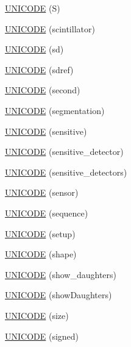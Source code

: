 \begin{DoxyCompactItemize}
\item 
\hyperlink{namespace_d_d4hep_1_1_x_m_l_af94f56ce81ab972984228369edb75959}{U\+N\+I\+C\+O\+DE} (S)
\item 
\hyperlink{namespace_d_d4hep_1_1_x_m_l_a5f445b0b81e3d1c46398930e978810a9}{U\+N\+I\+C\+O\+DE} (scintillator)
\item 
\hyperlink{namespace_d_d4hep_1_1_x_m_l_a4dbc6a36c60f2b43aad7b1f06167d0d8}{U\+N\+I\+C\+O\+DE} (sd)
\item 
\hyperlink{namespace_d_d4hep_1_1_x_m_l_a3366ec5d00717a755b13913dd6ba9092}{U\+N\+I\+C\+O\+DE} (sdref)
\item 
\hyperlink{namespace_d_d4hep_1_1_x_m_l_a3093c361a4ebe4730215c79afec7b7ab}{U\+N\+I\+C\+O\+DE} (second)
\item 
\hyperlink{namespace_d_d4hep_1_1_x_m_l_a9c87e5f51620bde064e5301d0d7e8191}{U\+N\+I\+C\+O\+DE} (segmentation)
\item 
\hyperlink{namespace_d_d4hep_1_1_x_m_l_af887183aa9381edbe8e0c6e0d65d07c0}{U\+N\+I\+C\+O\+DE} (sensitive)
\item 
\hyperlink{namespace_d_d4hep_1_1_x_m_l_a9d2bf762671cf86615c9485017775a97}{U\+N\+I\+C\+O\+DE} (sensitive\+\_\+detector)
\item 
\hyperlink{namespace_d_d4hep_1_1_x_m_l_a032cb38ff12c06d77a6f79b3a6930311}{U\+N\+I\+C\+O\+DE} (sensitive\+\_\+detectors)
\item 
\hyperlink{namespace_d_d4hep_1_1_x_m_l_af87cf432f8b3a6489e2801dec68d6020}{U\+N\+I\+C\+O\+DE} (sensor)
\item 
\hyperlink{namespace_d_d4hep_1_1_x_m_l_a788e7ce3fe7109bef74e5559ca6ac729}{U\+N\+I\+C\+O\+DE} (sequence)
\item 
\hyperlink{namespace_d_d4hep_1_1_x_m_l_a1d527cd3b91e65b33b1844b463582be1}{U\+N\+I\+C\+O\+DE} (setup)
\item 
\hyperlink{namespace_d_d4hep_1_1_x_m_l_a5137168556c18b86cc92e527300bfa27}{U\+N\+I\+C\+O\+DE} (shape)
\item 
\hyperlink{namespace_d_d4hep_1_1_x_m_l_af733a40f814c74738f4496285f1a00dd}{U\+N\+I\+C\+O\+DE} (show\+\_\+daughters)
\item 
\hyperlink{namespace_d_d4hep_1_1_x_m_l_afb2e61ae1dd1d73ec60ea3845b99e007}{U\+N\+I\+C\+O\+DE} (show\+Daughters)
\item 
\hyperlink{namespace_d_d4hep_1_1_x_m_l_ace70b0cb76d08bc48373496df537353e}{U\+N\+I\+C\+O\+DE} (size)
\item 
\hyperlink{namespace_d_d4hep_1_1_x_m_l_a9e560f2beeeb45f725a1964a5e0193b7}{U\+N\+I\+C\+O\+DE} (signed)
\item 

\end{DoxyCompactItemize}
